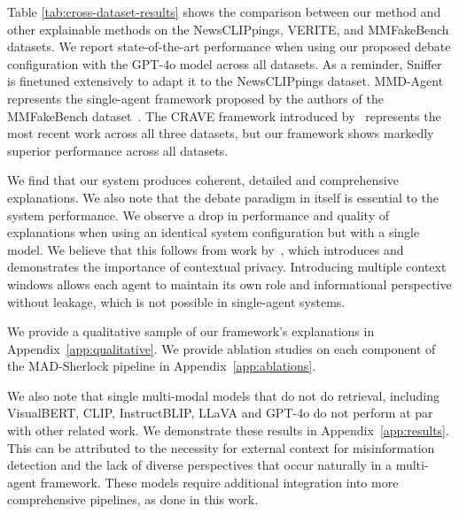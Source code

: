 \documentclass{article}
\theoremstyle{plain}
\theoremstyle{definition}
\theoremstyle{remark}
\newcommand{\frameworkname}{MAD-Sherlock}
\begin{document}
Table \ref{tab:cross-dataset-results} shows the comparison between our method and other explainable methods on the NewsCLIPpings, VERITE, and MMFakeBench datasets. We report state-of-the-art performance when using our proposed debate configuration with the GPT-4o \citep{openai2024gpt4technicalreport, gpt4o} model across all datasets. As a reminder, Sniffer \citep{qi2024sniffermultimodallargelanguage} is finetuned extensively to adapt it to the NewsCLIPpings dataset. MMD-Agent represents the single-agent framework proposed by the authors of the MMFakeBench dataset~\cite{mmfakebench}. The CRAVE framework introduced by~\citet{crave} represents the most recent work across all three datasets, but our framework shows markedly superior performance across all datasets.

We find that our system produces coherent, detailed and comprehensive explanations. We also note that the debate paradigm in itself is essential to the system performance. We observe a drop in performance and quality of explanations when using an identical system configuration but with a single model. We believe that this follows from work by~\citet{can_llms_keep_a_secret}, which introduces and demonstrates the importance of contextual privacy. Introducing multiple context windows allows each agent to maintain its own role and informational perspective without leakage, which is not possible in single-agent systems.

We provide a qualitative sample of our framework's explanations in Appendix~\ref{app:qualitative}. We provide ablation studies on each component of the \frameworkname{} pipeline in Appendix~\ref{app:ablations}.

We also note that single multi-modal models that do not do retrieval, including VisualBERT, CLIP, InstructBLIP, LLaVA and GPT-4o do not perform at par with other related work. We demonstrate these results in Appendix~\ref{app:results}. This can be attributed to the necessity for external context for misinformation detection and the lack of diverse perspectives that occur naturally in a multi-agent framework. These models require additional integration into more comprehensive pipelines, as done in this work. 



\end{document}
